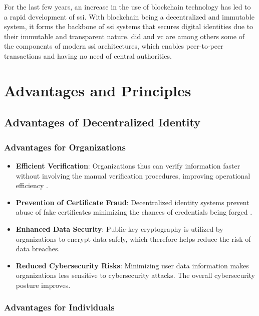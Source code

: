For the last few years, an increase in the use of blockchain technology has led to a rapid development of \gls{ssi}. With blockchain being a decentralized and
immutable system, it forms the backbone of \gls{ssi} systems that secures digital identities due to their immutable and transparent nature. \gls{did} and \gls{vc} are 
among others some of the components of modern \gls{ssi} architectures, which enables peer-to-peer transactions and having no need of central authorities.

\section{Advantages and Principles}

\subsection{Advantages of Decentralized Identity }

\subsubsection{Advantages for Organizations}

\begin{itemize}
    \item \textbf{Efficient Verification}: Organizations thus can verify information faster without involving the manual verification procedures, improving operational efficiency \cite{dockio}.
    \item \textbf{Prevention of Certificate Fraud}: Decentralized identity systems prevent abuse of fake certificates minimizing the chances of credentials being forged .
    \item \textbf{Enhanced Data Security}: Public-key cryptography is utilized by organizations to encrypt data safely, which therefore helps reduce the risk of data breaches.
    \item \textbf{Reduced Cybersecurity Risks}: Minimizing user data information makes organizations less sensitive to cybersecurity attacks. The overall cybersecurity posture improves.
\end{itemize}

\subsubsection{Advantages for Individuals}

